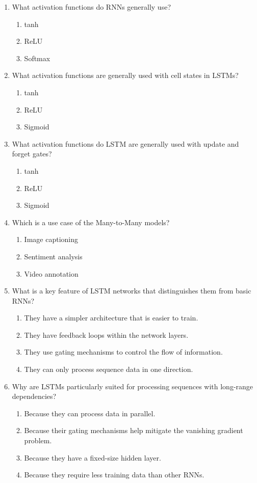 \documentclass{report}
\numberwithin{equation}{section}
\begin{document}
\begin{enumerate}
\item What activation functions do RNNs generally use?
\begin{enumerate}[label=\alph*.]
\item tanh
\item ReLU
\item Softmax
\end{enumerate}
\item What activation functions are generally used with cell states in LSTMs?
\begin{enumerate}[label=\alph*.]
\item tanh
\item ReLU
\item Sigmoid
\end{enumerate}
\item What activation functions do LSTM are generally used with update and forget gates?
\begin{enumerate}[label=\alph*.]
\item tanh
\item ReLU
\item Sigmoid
\end{enumerate}
\item Which is a use case of the Many-to-Many models?
\begin{enumerate}[label=\alph*.]
\item Image captioning
\item Sentiment analysis
\item Video annotation
\end{enumerate}
\item What is a key feature of LSTM networks that distinguishes them from basic RNNs?
\begin{enumerate}[label=\alph*.]
\item They have a simpler architecture that is easier to train.
\item They have feedback loops within the network layers.
\item They use gating mechanisms to control the flow of information.
\item They can only process sequence data in one direction.
\end{enumerate}

\item Why are LSTMs particularly suited for processing sequences with long-range dependencies?
\begin{enumerate}[label=\alph*.]
\item Because they can process data in parallel.
\item Because their gating mechanisms help mitigate the vanishing gradient problem.
\item Because they have a fixed-size hidden layer.
\item Because they require less training data than other RNNs.
\end{enumerate}


\end{enumerate}
\end{document}
